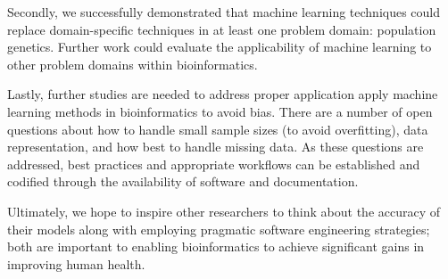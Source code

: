 Secondly, we successfully demonstrated that machine learning techniques could replace domain-specific techniques in at least one problem domain: population genetics. Further work could evaluate the applicability of machine learning to other problem domains within bioinformatics.

Lastly, further studies are needed to address proper application apply machine learning methods in bioinformatics to avoid bias. There are a number of open questions about how to handle small sample sizes (to avoid overfitting), data representation, and how best to handle missing data.  As these questions are addressed, best practices and appropriate workflows can be established and codified through the availability of software and documentation.

Ultimately, we hope to inspire other researchers to think about the accuracy of their models along with employing pragmatic software engineering strategies; both are important to enabling bioinformatics to achieve significant gains in improving human health.

